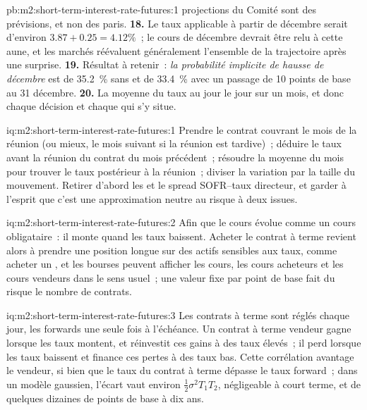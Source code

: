 \begin{solution}{pb:m2:short-term-interest-rate-futures:1}
projections du Comité sont des prévisions, et non des paris.
\textbf{18.} Le taux applicable à partir de décembre serait d'environ $3.87 + 0.25 = 4.12\%$~; le cours de décembre devrait être relu à cette aune,
et les marchés réévaluent généralement l'ensemble
de la trajectoire après une surprise.
\textbf{19.} Résultat à retenir~: \emph{la probabilité implicite de hausse de décembre} est de 35.2~\% sans
 et de 33.4~\% avec un passage de 10 points de base au 31 décembre.
\textbf{20.} La moyenne du taux au jour le jour sur un mois, et donc chaque
décision et chaque  qui s'y situe.
\end{solution}

\begin{solution}{iq:m2:short-term-interest-rate-futures:1}
Prendre le contrat couvrant le mois de la réunion (ou mieux, le mois suivant si
la réunion est tardive)~; déduire le taux avant la réunion du contrat du mois
précédent~; résoudre la moyenne du mois pour trouver le taux postérieur à la réunion~; diviser
la variation par la taille du mouvement. Retirer d'abord les  et
le spread SOFR--taux directeur, et garder à l'esprit que c'est une approximation neutre au risque à deux issues.
\end{solution}

\begin{solution}{iq:m2:short-term-interest-rate-futures:2}
Afin que le cours évolue comme un cours obligataire~: il monte quand les taux baissent. Acheter le
contrat à terme revient alors à prendre une position longue sur des actifs sensibles aux taux, comme acheter un ,
et les bourses peuvent afficher les cours, les cours acheteurs et les cours vendeurs dans le sens usuel~; une
valeur fixe par point de base fait du risque le nombre de contrats.
\end{solution}

\begin{solution}{iq:m2:short-term-interest-rate-futures:3}
Les contrats à terme sont réglés chaque jour, les forwards une seule fois à l'échéance. Un contrat à terme vendeur gagne lorsque les taux montent,
et réinvestit ces gains à des taux élevés~; il perd lorsque les taux baissent et finance ces pertes à des taux bas. Cette corrélation avantage le vendeur,
si bien que le taux du contrat à terme dépasse le taux forward~; dans un modèle gaussien, l'écart vaut environ
$\frac12\sigma^2 T_1 T_2$, négligeable à court terme,
et de quelques dizaines de points de base à dix ans.
\end{solution}


